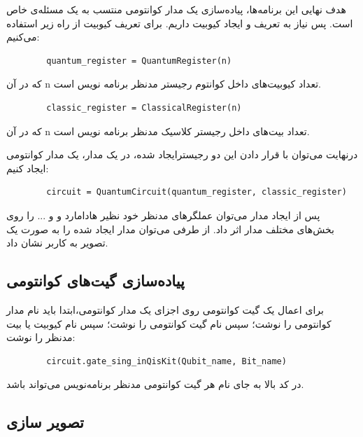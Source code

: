 \documentclass{book}
\begin{document}
هدف نهایی این برنامه‌ها، پیاده‌سازی یک مدار کوانتومی‌ منتسب به یک مسئله‌ی خاص است. پس نیاز به تعریف و ایجاد کیوبیت داریم. برای تعریف کیوبیت از راه زیر استفاده می‌کنیم:

\begin{latin}
	\begin{verbatim}
		quantum_register = QuantumRegister(n)
	\end{verbatim}
\end{latin}
که در آن n تعداد کیوبیت‌های داخل کوانتوم رجیستر مدنظر برنامه نویس است.


\begin{latin}
	\begin{verbatim}
		classic_register = ClassicalRegister(n)
	\end{verbatim}
\end{latin}
که در آن n تعداد بیت‌های داخل رجیستر کلاسیک مدنظر برنامه نویس است.


درنهایت ‌می‌توان با قرار دادن این دو رجیستر‌ایجاد شده،‌ در یک مدار، یک مدار کوانتومی ایجاد کنیم:


\begin{latin}
	\begin{verbatim}
		circuit = QuantumCircuit(quantum_register, classic_register)
	\end{verbatim}
\end{latin}


پس از ایجاد مدار می‌توان عملگر‌های مدنظر خود نظیر هادامارد و  و ... را روی بخش‌های مختلف مدار اثر داد.
از طرفی می‌توان مدار ایجاد شده را به صورت یک تصویر به کاربر نشان داد.


\subsection{پیاده‌سازی گیت‌های کوانتومی}
برای اعمال یک گیت کوانتومی روی اجزای یک مدار کوانتومی،‌ابتدا باید نام مدار کوانتومی را نوشت؛ سپس نام گیت کوانتومی را نوشت؛ سپس نام کیوبیت یا بیت مدنظر را نوشت: 

\begin{latin}
	\begin{verbatim}
		circuit.gate_sing_inQisKit(Qubit_name, Bit_name)
	\end{verbatim}
\end{latin}


در کد بالا به جای  نام هر گیت کوانتومی مدنظر برنامه‌نویس می‌تواند باشد.

\pagebreak
\subsection{تصویر سازی}
\end{document}
